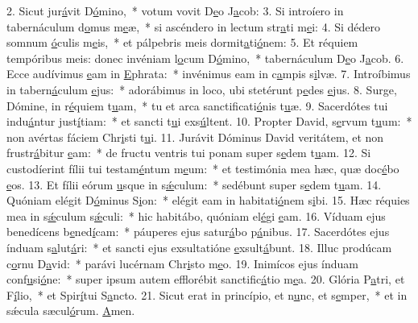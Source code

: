 2. Sicut jur\uline{á}vit D\uline{ó}mino,~* votum vovit D\uline{e}o J\uline{a}cob:
3. Si introíero in tabernáculum d\uline{o}mus m\uline{e}æ,~* si ascéndero in lectum str\uline{a}ti m\uline{e}i:
4. Si dédero somnum \uline{ó}culis m\uline{e}is,~* et pálpebris meis dormit\uline{a}ti\uline{ó}nem:
5. Et réquiem tempóribus meis: donec invéniam l\uline{o}cum D\uline{ó}mino,~* tabernáculum D\uline{e}o J\uline{a}cob.
6. Ecce audívimus \uline{e}am in \uline{E}phrata:~* invénimus eam in c\uline{a}mpis s\uline{i}lvæ.
7. Introíbimus in tabern\uline{á}culum \uline{e}jus:~* adorábimus in loco, ubi stetérunt p\uline{e}des \uline{e}jus.
8. Surge, Dómine, in r\uline{é}quiem t\uline{u}am,~* tu et arca sanctificati\uline{ó}nis t\uline{u}æ.
9. Sacerdótes tui indu\uline{á}ntur just\uline{í}tiam:~* et sancti t\uline{u}i exs\uline{ú}ltent.
10. Propter David, s\uline{e}rvum t\uline{u}um:~* non avértas fáciem Chr\uline{i}sti t\uline{u}i.
11. Jurávit Dóminus David veritátem, et non frustr\uline{á}bitur \uline{e}am:~* de fructu ventris tui ponam super s\uline{e}dem t\uline{u}am.
12. Si custodíerint fílii tui testam\uline{é}ntum m\uline{e}um:~* et testimónia mea hæc, quæ doc\uline{é}bo \uline{e}os.
13. Et fílii eórum \uline{u}sque in s\uline{ǽ}culum:~* sedébunt super s\uline{e}dem t\uline{u}am.
14. Quóniam elégit D\uline{ó}minus S\uline{i}on:~* elégit eam in habitati\uline{ó}nem s\uline{i}bi.
15. Hæc réquies mea in s\uline{ǽ}culum s\uline{ǽ}culi:~* hic habitábo, quóniam el\uline{é}gi \uline{e}am.
16. Víduam ejus benedícens b\uline{e}ned\uline{í}cam:~* páuperes ejus satur\uline{á}bo p\uline{á}nibus.
17. Sacerdótes ejus índuam s\uline{a}lut\uline{á}ri:~* et sancti ejus exsultatióne \uline{e}xsult\uline{á}bunt.
18. Illuc prodúcam c\uline{o}rnu D\uline{a}vid:~* parávi lucérnam Chr\uline{i}sto m\uline{e}o.
19. Inimícos ejus índuam conf\uline{u}si\uline{ó}ne:~* super ipsum autem efflorébit sanctific\uline{á}tio m\uline{e}a.
20. Glória P\uline{a}tri, et F\uline{í}lio,~* et Spir\uline{í}tui S\uline{a}ncto.
21. Sicut erat in princípio, et n\uline{u}nc, et s\uline{e}mper,~* et in sǽcula sæcul\uline{ó}rum. \uline{A}men.
